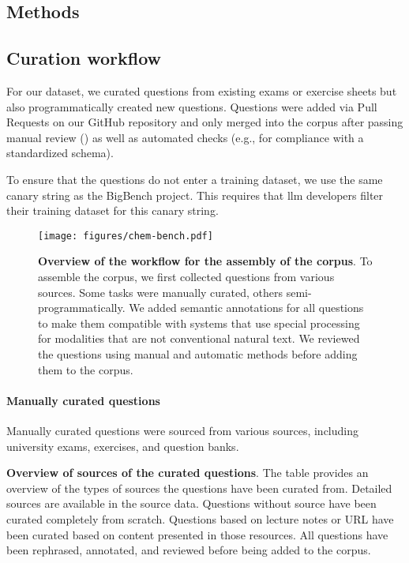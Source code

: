\documentclass[11pt, oneside]{article}
\begin{document}
\begin{refsection}
\clearpage

\section{Methods}

\subsection{Curation workflow}\label{sec:curation}
For our dataset, we curated questions from existing exams or exercise sheets but also programmatically created new questions.
Questions were added via Pull Requests on our GitHub repository and only merged into the corpus after passing manual review () as well as automated checks (e.g., for compliance with a standardized schema).

To ensure that the questions do not enter a training dataset, we use the same canary string as the BigBench project.
This requires that \Gls{llm} developers filter their training dataset for this canary string.\autocite{openai2024gpt4, srivastava2022beyond}

\begin{figure}[!h]
    \texttt{[image: figures/chem-bench.pdf]}
    \caption{\textbf{Overview of the workflow for the assembly of the \chembench corpus}.
    To assemble the \chembench corpus, we first collected questions from various sources. Some tasks were manually curated, others semi-programmatically. We added semantic annotations for all questions to make them compatible with systems that use special processing for modalities that are not conventional natural text. We reviewed the questions using manual and automatic methods before adding them to the corpus.}
    \label{fig:curation_workflow}
\end{figure}

\paragraph{Manually curated questions}
Manually curated questions were sourced from various sources, including university exams, exercises, and question banks.

\begin{table}
    \centering
    \caption{\textbf{Overview of sources of the curated questions}. The table provides an overview of the types of sources the questions have been curated from. Detailed sources are available in the source data. Questions without source have been curated completely from scratch. Questions based on lecture notes or URL have been curated based on content presented in those resources. All questions have been rephrased, annotated, and reviewed before being added to the corpus.}
    \label{tab:sources}
\end{table}




\end{refsection}
\end{document}
